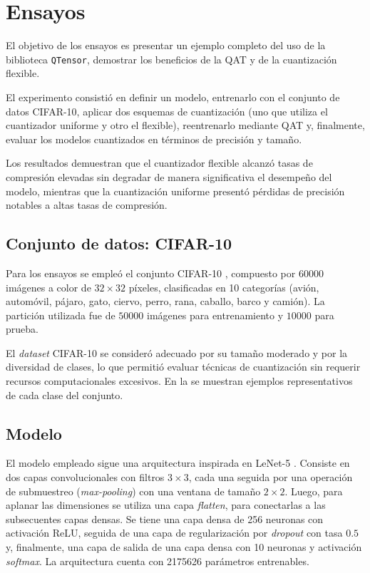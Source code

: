 \section{Ensayos}
\label{sec:ensayos}
El objetivo de los ensayos es presentar un ejemplo completo del uso de la biblioteca \texttt{QTensor}, demostrar los beneficios de la QAT y de la cuantización flexible.

El experimento consistió en definir un modelo, entrenarlo con el conjunto de datos CIFAR-10, aplicar dos esquemas de cuantización (uno que utiliza el cuantizador uniforme y otro el flexible), reentrenarlo mediante QAT y, finalmente, evaluar los modelos cuantizados en términos de precisión y tamaño.

Los resultados demuestran que el cuantizador flexible alcanzó tasas de compresión elevadas sin degradar de manera significativa el desempeño del modelo, mientras que la cuantización uniforme presentó pérdidas de precisión notables a altas tasas de compresión.

\subsection{Conjunto de datos: CIFAR-10}
Para los ensayos se empleó el conjunto CIFAR-10 \cite{krizhevsky2009learning}, compuesto por $60000$ imágenes a color de $32\times32$ píxeles, clasificadas en 10 categorías (avión, automóvil, pájaro, gato, ciervo, perro, rana, caballo, barco y camión). La partición utilizada fue de $50000$ imágenes para entrenamiento y $10000$ para prueba.

El \textit{dataset} CIFAR-10 se consideró adecuado por su tamaño moderado y por la diversidad de clases, lo que permitió evaluar técnicas de cuantización sin requerir recursos computacionales excesivos. En la  se muestran ejemplos representativos de cada clase del conjunto.


\subsection{Modelo}
\label{sec:model}
El modelo empleado sigue una arquitectura inspirada en LeNet-5 \cite{lecun1998gradient}. Consiste en dos capas convolucionales con filtros $3\times3$, cada una seguida por una operación de submuestreo (\textit{max-pooling}) con una ventana de tamaño $2\times2$. Luego, para aplanar las dimensiones se utiliza una capa \textit{flatten}, para conectarlas a las subsecuentes capas densas. Se tiene una capa densa de 256 neuronas con activación ReLU, seguida de una capa de regularización por \textit{dropout} con tasa $0.5$ y, finalmente, una capa de salida de una capa densa con 10 neuronas y activación \textit{softmax}. La arquitectura cuenta con \num{2175626} parámetros entrenables.

